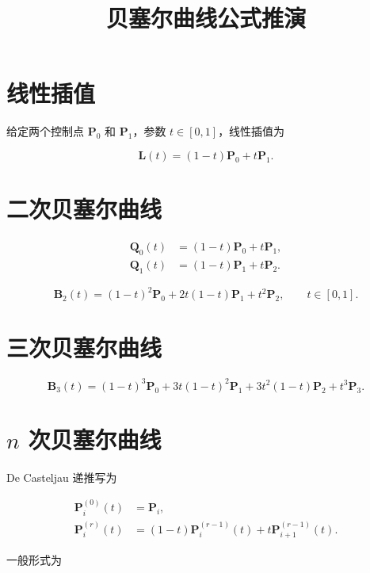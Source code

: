\documentclass[UTF8]{ctexart}
\title{贝塞尔曲线公式推演}
\author{}
\date{}
\begin{document}
\maketitle

\section{线性插值}

给定两个控制点 $\bm P_0$ 和 $\bm P_1$，参数 $t\in[0,1]$，线性插值为

\begin{equation}
\bm L(t)=(1-t)\bm P_0+t\bm P_1.
\label{eq:bezier-linear}
\end{equation}

\section{二次贝塞尔曲线}

\begin{align}
\bm Q_0(t)&=(1-t)\bm P_0+t\bm P_1,\\
\bm Q_1(t)&=(1-t)\bm P_1+t\bm P_2.
\end{align}

\begin{equation}
\boxed{
\bm B_2(t)
=
(1-t)^2\bm P_0
+2t(1-t)\bm P_1
+t^2\bm P_2
},
\qquad t\in[0,1].
\label{eq:bezier-quadratic}
\end{equation}

\section{三次贝塞尔曲线}

\begin{equation}
\boxed{
\bm B_3(t)
=
(1-t)^3\bm P_0
+3t(1-t)^2\bm P_1
+3t^2(1-t)\bm P_2
+t^3\bm P_3
}.
\label{eq:bezier-cubic}
\end{equation}

\section{$n$ 次贝塞尔曲线}

De Casteljau 递推写为

\begin{align}
\bm P_i^{(0)}(t)&=\bm P_i,\\
\bm P_i^{(r)}(t)
&=
(1-t)\bm P_i^{(r-1)}(t)
+t\bm P_{i+1}^{(r-1)}(t).
\end{align}

一般形式为
\end{document}
